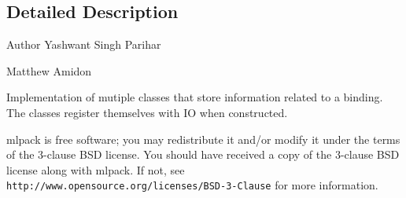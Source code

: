 \subsection{Detailed Description}
\begin{DoxyAuthor}{Author}
Yashwant Singh Parihar 

Matthew Amidon
\end{DoxyAuthor}
Implementation of mutiple classes that store information related to a binding. The classes register themselves with IO when constructed.

mlpack is free software; you may redistribute it and/or modify it under the terms of the 3-\/clause B\+SD license. You should have received a copy of the 3-\/clause B\+SD license along with mlpack. If not, see {\tt http\+://www.\+opensource.\+org/licenses/\+B\+S\+D-\/3-\/\+Clause} for more information. 